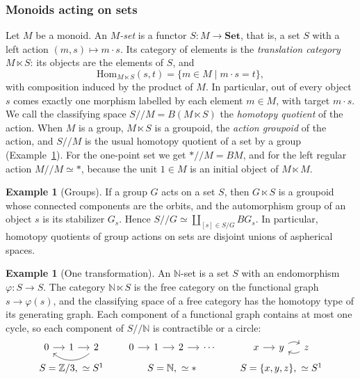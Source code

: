 \documentclass[11pt]{amsart}
\theoremstyle{definition}
\newtheorem{example}[teo]{Example}
\theoremstyle{remark}
\numberwithin{figure}{section}%
\newcommand{\Set}{\mathbf{Set}}
\newcommand{\Hom}{\mathrm{Hom}}
\begin{document}
\subsubsection{Monoids acting on sets}
\label{subsubsec:monoid-actions}

Let $M$ be a monoid. An \emph{$M$-set} is a functor $S\colon M\to\Set$, that is, a set $S$ with a left action $(m,s)\mapsto m\cdot s$. Its category of elements is the \emph{translation category} $M\ltimes S$: its objects are the elements of $S$, and
\[
\Hom_{M\ltimes S}(s,t)=\{m\in M\mid m\cdot s=t\},
\]
with composition induced by the product of $M$. In particular, out of every object $s$ comes exactly one morphism labelled by each element $m\in M$, with target $m\cdot s$. We call the classifying space $S/\!/M=B(M\ltimes S)$ the \emph{homotopy quotient} of the action. When $M$ is a group, $M\ltimes S$ is a groupoid, the \emph{action groupoid} of the action, and $S/\!/M$ is the usual homotopy quotient of a set by a group (Example~\ref{ex:groups}). For the one-point set we get $*/\!/M=BM$, and for the left regular action $M/\!/M\simeq*$, because the unit $1\in M$ is an initial object of $M\ltimes M$.

\begin{example}[Groups]
\label{ex:groups}
If a group $G$ acts on a set $S$, then $G\ltimes S$ is a groupoid whose connected components are the orbits, and the automorphism group of an object $s$ is its stabilizer $G_s$. Hence $S/\!/G\simeq\coprod_{[s]\in S/G}BG_s$. In particular, homotopy quotients of group actions on sets are disjoint unions of aspherical spaces.
\end{example}

\begin{example}[One transformation]
\label{ex:N}
An $\mathbb N$-set is a set $S$ with an endomorphism $\varphi\colon S\to S$. The category $\mathbb N\ltimes S$ is the free category on the functional graph $s\to\varphi(s)$, and the classifying space of a free category has the homotopy type of its generating graph. Each component of a functional graph contains at most one cycle, so each component of $S/\!/\mathbb N$ is contractible or a circle:
\[
\begin{array}{c@{\hspace{2.2em}}c@{\hspace{2.2em}}c}
\begin{tikzcd}[column sep=small]
0 \arrow[r] & 1 \arrow[r] & 2 \arrow[ll,bend left=40]
\end{tikzcd}
&
\begin{tikzcd}[column sep=small]
0 \arrow[r] & 1 \arrow[r] & 2 \arrow[r] & \cdots
\end{tikzcd}
&
\begin{tikzcd}[column sep=small]
x \arrow[r] & y \arrow[r,bend left=30] & z \arrow[l,bend left=30]
\end{tikzcd}
\\[4pt]
S=\mathbb Z/3,\ \simeq S^1 & S=\mathbb N,\ \simeq * & S=\{x,y,z\},\ \simeq S^1
\end{array}
\]
\end{example}
\end{document}
